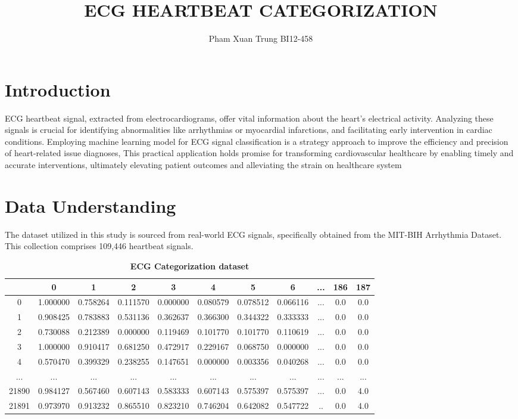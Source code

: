 \documentclass{article}
\title{ECG HEARTBEAT CATEGORIZATION}
\author{Pham Xuan Trung BI12-458}
\begin{document}
\maketitle

\section{Introduction}
ECG heartbeat signal, extracted from electrocardiograms, offer vital information about the heart's electrical activity. Analyzing these signals is crucial for identifying abnormalities like arrhythmias or myocardial infarctions, and facilitating early intervention in cardiac conditions. Employing machine learning model for ECG signal classification is a strategy approach to improve the efficiency and precision of heart-related issue diagnoses, This practical application holds promise for transforming cardiovascular healthcare by enabling timely and accurate interventions, ultimately elevating patient outcomes and alleviating the strain on healthcare system

\section{Data Understanding}

The dataset utilized in this study is sourced from real-world ECG signals, specifically obtained from the MIT-BIH Arrhythmia Dataset. This collection comprises 109,446 heartbeat signals.
\begin{table}[ht]
\centering
\begin{tabular}{|c|cccccccccc|}
\hline
\multicolumn{1}{|c|}{} & 0& 1& 2& 3& 4& 5& 6& ...& 186& 187\\ \hline
0 & 1.000000& 0.758264& 0.111570 & 0.000000 &0.080579  &0.078512 &0.066116 &... &0.0 &0.0 \\ \hline
1 & 0.908425 & 0.783883	&0.531136&0.362637&0.366300&0.344322 &0.333333&...&0.0 &0.0 \\ \hline
2 & 0.730088 & 0.212389&0.000000&0.119469&0.101770&0.101770 &0.110619&...&0.0 &0.0 \\ \hline
3 &1.000000	&0.910417	&0.681250	&0.472917	&0.229167	&0.068750	&0.000000&...&0.0 &0.0 \\ \hline
4 &0.570470	&0.399329	&0.238255	&0.147651	&0.000000	&0.003356	&0.040268&...&0.0 &0.0\\ \hline
...& ... & ...&...&...&...&... &...&...&...& ...\\ \hline
21890&0.984127	&0.567460	&0.607143	&0.583333	&0.607143	&0.575397	&0.575397&...&0.0 &4.0\\ \hline
21891 &0.973970	&0.913232	&0.865510	&0.823210	&0.746204	&0.642082	&0.547722&..&0.0 &4.0 \\ \hline
\end{tabular}
\caption{\textbf{ECG Categorization dataset}}
\label{tab:my_table} %
\end{table}
\end{document}
